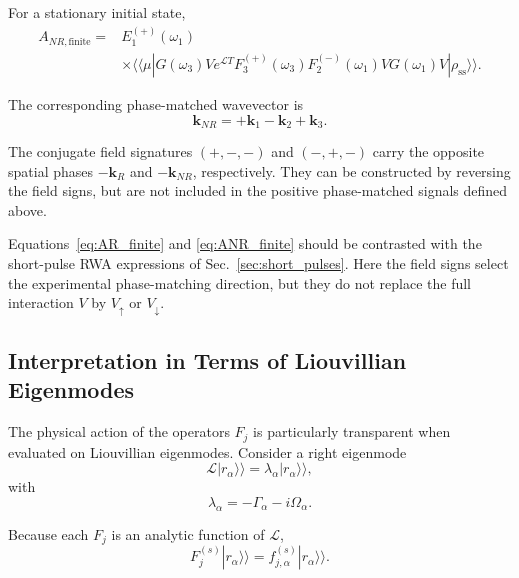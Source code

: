 \documentclass[11pt]{article}
\begin{document}
For a stationary initial state,
%
\begin{equation}
\boxed{
\begin{aligned}
A_{NR,\mathrm{finite}}
={}&
E_1^{(+)}(\omega_1)
\\
&\times
\langle\!\langle\mu|
G(\omega_3)
V
e^{\mathcal{L}T}
F_3^{(+)}(\omega_3)
F_2^{(-)}(\omega_1)
V
G(\omega_1)
V
|\rho_{\mathrm{ss}}\rangle\rangle .
\end{aligned}
}
\label{eq:ANR_finite}
\end{equation}

The corresponding phase-matched wavevector is
%
\begin{equation}
\mathbf{k}_{NR}
=
+\mathbf{k}_1-\mathbf{k}_2+\mathbf{k}_3.
\end{equation}

The conjugate field signatures
$(+,-,-)$ and $(-,+,-)$ carry the opposite spatial phases
$-\mathbf{k}_R$ and $-\mathbf{k}_{NR}$, respectively. They can be
constructed by reversing the field signs, but are not included in the
positive phase-matched signals defined above.

Equations~\eqref{eq:AR_finite} and
\eqref{eq:ANR_finite} should be contrasted with the short-pulse RWA
expressions of Sec.~\ref{sec:short_pulses}. Here the field signs select
the experimental phase-matching direction, but they do not replace the
full interaction $V$ by $V_{\uparrow}$ or $V_{\downarrow}$.


\subsection{Interpretation in Terms of Liouvillian Eigenmodes}
\label{subsec:F_eigenbasis}

The physical action of the operators $F_j$ is particularly transparent
when evaluated on Liouvillian eigenmodes. Consider a right eigenmode
%
\begin{equation}
\boxed{
\mathcal{L}
|r_\alpha\rangle\rangle
=
\lambda_\alpha
|r_\alpha\rangle\rangle ,
}
\label{eq:liouvillian_eigenmode}
\end{equation}
%
with
%
\begin{equation}
\lambda_\alpha
=
-\Gamma_\alpha
-
i\Omega_\alpha.
\end{equation}

Because each $F_j$ is an analytic function of $\mathcal{L}$,
%
\begin{equation}
F_j^{(s)}
|r_\alpha\rangle\rangle
=
f_{j,\alpha}^{(s)}
|r_\alpha\rangle\rangle .
\end{equation}
\end{document}
